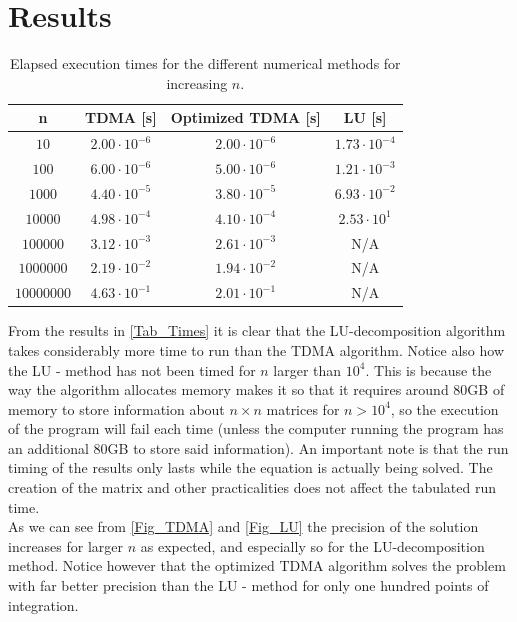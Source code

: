 \documentclass[a4paper, english]{amsart} %
\begin{document}
\section{Results}
\begin{table}[H]
\centering
\caption{Elapsed execution times for the different numerical methods for increasing $n$.}
\label{Tab_Times}
\begin{tabular}{| c | c | c | c |}
	\hline
	n & TDMA [s] & Optimized TDMA [s] & LU [s] \\
	\hline
	$10$ &$ 2.00\cdot10^{-6}$ & $2.00\cdot10^{-6}$ & $1.73\cdot10^{-4}$\\
	\hline
	$100$ & $6.00\cdot10^{-6}$ & $5.00\cdot10^{-6}$ & $1.21\cdot10^{-3}$\\
	\hline
	$1000$ & $4.40\cdot10^{-5}$ & $3.80\cdot10^{-5}$ & $6.93\cdot10^{-2}$\\
	\hline
	$10000$ & $4.98\cdot10^{-4}$ & $4.10\cdot10^{-4}$ & $2.53\cdot10^{1}$\\
	\hline
	$100000$ & $3.12\cdot10^{-3}$ & $2.61\cdot10^{-3}$ & N/A\\
	\hline
	$1000000$ & $2.19\cdot10^{-2}$ & $1.94\cdot10^{-2}$ & N/A\\
	\hline
	$10000000$ & $4.63\cdot10^{-1}$ & $2.01\cdot10^{-1}$ & N/A\\
	\hline
\end{tabular}
\end{table}
From the results in \autoref{Tab_Times} it is clear that the LU-decomposition algorithm takes considerably more time to run than the TDMA algorithm. Notice also how the LU - method has not been timed for $n$ larger than $10^4$. This is because the way the algorithm allocates memory makes it so that it requires around 80GB of memory to store information about $n\times n$ matrices for $n > 10^4$, so the execution of the program will fail each time (unless the computer running the program has an additional 80GB to store said information). An important note is that the run timing of the results only lasts while the equation is actually being solved. The creation of the matrix and other practicalities does not affect the tabulated run time.\\

As we can see from \autoref{Fig_TDMA} and \autoref{Fig_LU} the precision of the solution increases for larger $n$ as expected, and especially so for the LU-decomposition method. Notice however that the optimized TDMA algorithm solves the problem with far better precision than the LU - method for only one hundred points of integration. 
\end{document}
